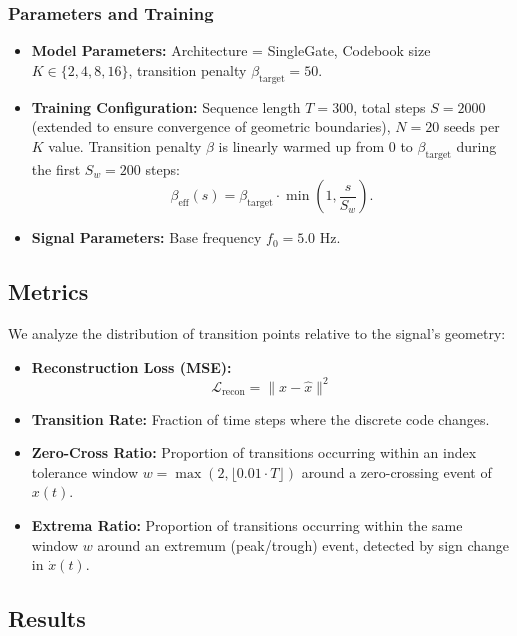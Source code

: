 \documentclass{article}
\begin{document}
\subsubsection{Parameters and Training}
\begin{itemize}
    \item \textbf{Model Parameters:} Architecture = SingleGate, Codebook size $K \in \{2, 4, 8, 16\}$, transition penalty $\beta_{\mathrm{target}} = 50$.
    \item \textbf{Training Configuration:} Sequence length $T=300$, total steps $S=2000$ (extended to ensure convergence of geometric boundaries), $N=20$ seeds per $K$ value. Transition penalty $\beta$ is linearly warmed up from $0$ to $\beta_{\mathrm{target}}$ during the first $S_w=200$ steps:
    \[
        \beta_{\mathrm{eff}}(s) = \beta_{\mathrm{target}} \cdot \min\!\left(1, \frac{s}{S_w}\right).
    \]
    \item \textbf{Signal Parameters:} Base frequency $f_0 = 5.0$ Hz.
\end{itemize}

\subsection{Metrics}
We analyze the distribution of transition points relative to the signal's geometry:

\begin{itemize}
    \item \textbf{Reconstruction Loss (MSE):}
    \begin{equation}
        \mathcal{L}_{\text{recon}} = \|x - \hat{x}\|^2
    \end{equation}
    \item \textbf{Transition Rate:} Fraction of time steps where the discrete code changes.
    \item \textbf{Zero-Cross Ratio:} Proportion of transitions occurring within an index tolerance window $w = \max(2, \lfloor 0.01 \cdot T \rfloor)$ around a zero-crossing event of $x(t)$.
    \item \textbf{Extrema Ratio:} Proportion of transitions occurring within the same window $w$ around an extremum (peak/trough) event, detected by sign change in $\dot{x}(t)$.
\end{itemize}

\subsection{Results}
\end{document}
